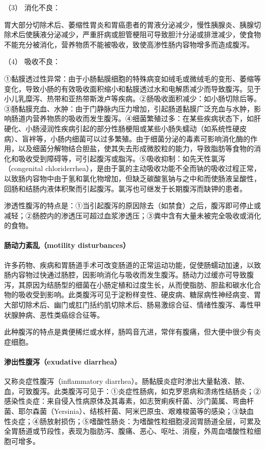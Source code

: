 \hypertarget{text00030.htmlux5cux23CHP1-12-1-2-3}{}
（3） 消化不良：

胃大部分切除术后、萎缩性胃炎和胃癌患者的胃液分泌减少，慢性胰腺炎、胰腺切除术后使胰液分泌减少，严重肝病或胆管梗阻可导致胆汁分泌或排泄减少，使食物不能充分被消化，营养物质不能被吸收，致使高渗性肠内容物增多而造成腹泻。

\hypertarget{text00030.htmlux5cux23CHP1-12-1-2-4}{}
（4） 吸收不良：

①黏膜透过性异常：由于小肠黏膜细胞的特殊病变如绒毛或微绒毛的变形、萎缩等变化，导致小肠的有效吸收面积缩小和黏膜透过水和电解质减少而导致腹泻。见于小儿乳糜泻、热带和亚热带斯泼卢等疾病。②肠吸收面积减少：如小肠切除后等。③肠黏膜充血、水肿：由于门静脉内压力增加，引起肠道黏膜广泛充血与水肿，影响肠道内营养物质的吸收而发生腹泻。④细菌繁殖过多：在某些疾病状态下，如肝硬化、小肠浸润性疾病引起的部分性肠梗阻或某些小肠失蠕动（如系统性硬皮病）、盲袢等，小肠内细菌可以过多繁殖。由于细菌分泌的毒素可影响消化酶的作用，以及细菌分解物结合胆盐，使其失去形成微胶粒的能力，导致脂肪等食物的消化和吸收受到障碍等，可引起腹泻或脂泻。⑤吸收抑制：如先天性氯泻（congenital
chloriderrhea），是由于氯的主动吸收功能不全而钠的吸收过程正常，以致肠内容物中由于氢和氯化物增加，但缺乏碳酸氢钠与之中和而使肠液呈酸性，回肠和结肠内液体积聚而引起腹泻。氯泻也可继发于长期腹泻而缺钾的患者。

渗透性腹泻的特点是：①当引起腹泻的原因除去（如禁食）之后，腹泻即可停止或减轻；②肠腔内的渗透压可超过血浆渗透压；③粪中含有大量未被完全吸收或消化的食物。

\paragraph{肠动力紊乱（motility disturbances）}

许多药物、疾病和胃肠道手术可改变肠道的正常运动功能，促使肠蠕动加速，以致肠内容物过快通过肠腔，因影响消化与吸收而发生腹泻。肠动力过缓亦可导致腹泻，其原因为结肠型的细菌在小肠定植和过度生长，从而使脂肪、胆盐和碳水化合物的吸收受到影响。此类腹泻可见于淀粉样变性、硬皮病、糖尿病性神经病变、胃大部切除术后、幽门或肛门括约肌切除术后、肠易激综合征、情绪性腹泻、毒性甲状腺肿病、恶性类癌综合征等。

此种腹泻的特点是粪便稀烂或水样，肠鸣音亢进，常伴有腹痛，但大便中很少有炎症细胞。

\paragraph{渗出性腹泻（exudative diarrhea）}

又称炎症性腹泻（inflammatory
diarrhea）。肠黏膜炎症时渗出大量黏液、脓、血，可致腹泻。此类腹泻可见于：①炎症性肠病，如克罗恩病和溃疡性结肠炎；②感染性炎症：来自侵入性病原体及其毒素，如志贺痢疾杆菌、沙门菌属、弯曲杆菌、耶尔森菌（Yersinia）、结核杆菌、阿米巴原虫、艰难梭菌等的感染；③缺血性炎症；④肠放射损伤；⑤嗜酸性肠炎：为嗜酸性粒细胞浸润胃肠道全层，可累及全胃肠道或节段性，表现为脂肪泻、腹痛、恶心、呕吐、消瘦，外周血嗜酸性粒细胞可增多。

